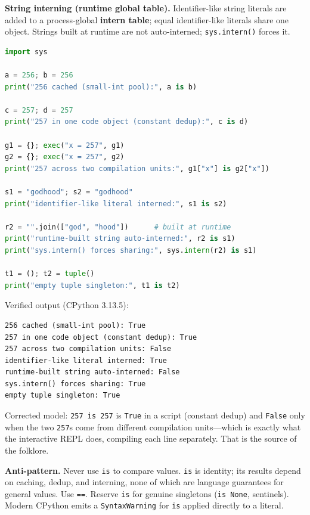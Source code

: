 \textbf{String interning (runtime global table).} Identifier-like string literals are added
to a process-global \textbf{intern table}; equal identifier-like literals share one object.
Strings built at runtime are not auto-interned; \texttt{sys.intern()} forces it.

\begin{lstlisting}[language=Python, caption={Three mechanisms, demonstrated and distinguished.}]
import sys

a = 256; b = 256
print("256 cached (small-int pool):", a is b)

c = 257; d = 257
print("257 in one code object (constant dedup):", c is d)

g1 = {}; exec("x = 257", g1)
g2 = {}; exec("x = 257", g2)
print("257 across two compilation units:", g1["x"] is g2["x"])

s1 = "godhood"; s2 = "godhood"
print("identifier-like literal interned:", s1 is s2)

r2 = "".join(["god", "hood"])      # built at runtime
print("runtime-built string auto-interned:", r2 is s1)
print("sys.intern() forces sharing:", sys.intern(r2) is s1)

t1 = (); t2 = tuple()
print("empty tuple singleton:", t1 is t2)
\end{lstlisting}

Verified output (CPython 3.13.5):

\begin{lstlisting}[caption={Output}]
256 cached (small-int pool): True
257 in one code object (constant dedup): True
257 across two compilation units: False
identifier-like literal interned: True
runtime-built string auto-interned: False
sys.intern() forces sharing: True
empty tuple singleton: True
\end{lstlisting}

Corrected model: \texttt{257 is 257} is \texttt{True} in a script (constant dedup) and
\texttt{False} only when the two \texttt{257}s come from different compilation units---which
is exactly what the interactive REPL does, compiling each line separately. That is the source
of the folklore.

\textbf{Anti-pattern.} Never use \texttt{is} to compare values. \texttt{is} is identity; its
results depend on caching, dedup, and interning, none of which are language guarantees for
general values. Use \texttt{==}. Reserve \texttt{is} for genuine singletons (\texttt{is
None}, sentinels). Modern CPython emits a \texttt{SyntaxWarning} for \texttt{is} applied
directly to a literal.

